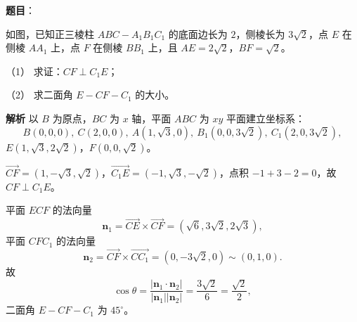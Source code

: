 \begin{answer}

\textbf{题目}：

如图，已知正三棱柱 $ABC-A_1B_1C_1$ 的底面边长为 $2$，侧棱长为 $3\sqrt2$，点 $E$ 在侧棱 $AA_1$ 上，点 $F$ 在侧棱 $BB_1$ 上，且 $AE=2\sqrt2$，$BF=\sqrt2$。

（1） 求证：$CF\perp C_1E$；

（2） 求二面角 $E-CF-C_1$ 的大小。
\nopagebreak[4]
\begin{center}\end{center}
\nopagebreak[4]
\textbf{解析}
以 $B$ 为原点，$BC$ 为 $x$ 轴，平面 $ABC$ 为 $xy$ 平面建立坐标系：
\nopagebreak[4]
\[B(0,0,0),\ C(2,0,0),\ A(1,\sqrt3,0),\ B_1(0,0,3\sqrt2),\ C_1(2,0,3\sqrt2),\]
$E(1,\sqrt3,2\sqrt2)$，$F(0,0,\sqrt2)$。

$\overrightarrow{CF}=(1,-\sqrt3,\sqrt2)$，$\overrightarrow{C_1E}=(-1,\sqrt3,-\sqrt2)$，点积 $-1+3-2=0$，故 $CF\perp C_1E$。

平面 $ECF$ 的法向量
\nopagebreak[4]
\[\boldsymbol n_1=\overrightarrow{CE}\times\overrightarrow{CF}=(\sqrt6,3\sqrt2,2\sqrt3),\]
平面 $CFC_1$ 的法向量
\nopagebreak[4]
\[\boldsymbol n_2=\overrightarrow{CF}\times\overrightarrow{CC_1}=(0,-3\sqrt2,0)\sim(0,1,0).\]
故
\nopagebreak[4]
\[\cos\theta=\frac{|\boldsymbol n_1\cdot\boldsymbol n_2|}{|\boldsymbol n_1||\boldsymbol n_2|}
=\frac{3\sqrt2}{6}=\frac{\sqrt2}2,\]
二面角 $E-CF-C_1$ 为 $45^\circ$。



\end{answer}
